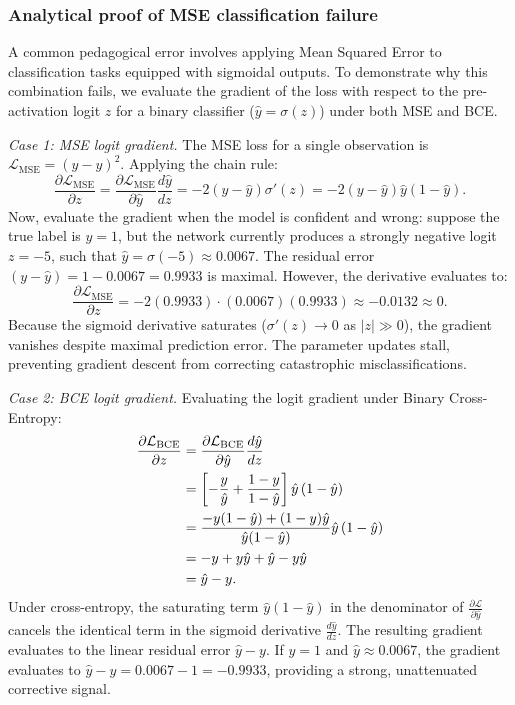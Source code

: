 \documentclass[../../../main.tex]{subfiles}
\begin{document}
\subsubsection{Analytical proof of MSE classification failure}

A common pedagogical error involves applying Mean Squared Error to classification tasks equipped with sigmoidal outputs. To demonstrate why this combination fails, we evaluate the gradient of the loss with respect to the pre-activation logit $z$ for a binary classifier ($\hat{y} = \sigma(z)$) under both MSE and BCE.

\textit{Case 1: MSE logit gradient.} The MSE loss for a single observation is $\mathcal{L}_{\text{MSE}} = (y - \hat{y})^2$. Applying the chain rule:
\begin{equation}
\frac{\partial \mathcal{L}_{\text{MSE}}}{\partial z} = \frac{\partial \mathcal{L}_{\text{MSE}}}{\partial \hat{y}} \frac{d\hat{y}}{dz} = -2\left(y - \hat{y}\right) \sigma'(z) = -2\left(y - \hat{y}\right) \hat{y}\left(1 - \hat{y}\right).
\end{equation}
Now, evaluate the gradient when the model is confident and wrong: suppose the true label is $y = 1$, but the network currently produces a strongly negative logit $z = -5$, such that $\hat{y} = \sigma(-5) \approx 0.0067$. The residual error $(y - \hat{y}) = 1 - 0.0067 = 0.9933$ is maximal. However, the derivative evaluates to:
\begin{equation}
\frac{\partial \mathcal{L}_{\text{MSE}}}{\partial z} = -2(0.9933) \cdot (0.0067)(0.9933) \approx -0.0132 \approx 0.
\end{equation}
Because the sigmoid derivative saturates ($\sigma'(z) \to 0$ as $|z| \gg 0$), the gradient vanishes despite maximal prediction error. The parameter updates stall, preventing gradient descent from correcting catastrophic misclassifications.

\textit{Case 2: BCE logit gradient.} Evaluating the logit gradient under Binary Cross-Entropy:
\begin{align}
\frac{\partial \mathcal{L}_{\text{BCE}}}{\partial z} &= \frac{\partial \mathcal{L}_{\text{BCE}}}{\partial \hat{y}} \frac{d\hat{y}}{dz} \notag \\
&= \left[ -\frac{y}{\hat{y}} + \frac{1 - y}{1 - \hat{y}} \right] \hat{y}\left(1 - \hat{y}\right) \notag \\
&= \frac{-y(1 - \hat{y}) + (1 - y)\hat{y}}{\hat{y}(1 - \hat{y})} \hat{y}\left(1 - \hat{y}\right) \notag \\
&= -y + y\hat{y} + \hat{y} - y\hat{y} \notag \\
&= \hat{y} - y.
\label{eq:bce_gradient_collapse}
\end{align}
Under cross-entropy, the saturating term $\hat{y}(1 - \hat{y})$ in the denominator of $\frac{\partial \mathcal{L}}{\partial \hat{y}}$ cancels the identical term in the sigmoid derivative $\frac{d\hat{y}}{dz}$. The resulting gradient evaluates to the linear residual error $\hat{y} - y$. If $y = 1$ and $\hat{y} \approx 0.0067$, the gradient evaluates to $\hat{y} - y = 0.0067 - 1 = -0.9933$, providing a strong, unattenuated corrective signal.
\end{document}

